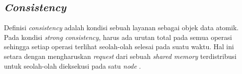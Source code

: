 \subsection{\textit{Consistency}}

Definisi \textit{consistency} adalah kondisi sebuah layanan sebagai objek data atomik. Pada kondisi \textit{strong consistency}, harus ada urutan total pada semua operasi sehingga setiap operasi terlihat seolah-olah selesai pada suatu waktu. Hal ini setara dengan mengharuskan \textit{request} dari sebuah \textit{shared memory} terdistribusi untuk seolah-olah dieksekusi pada satu \textit{node} \parencite{gilbert2002brewer}.